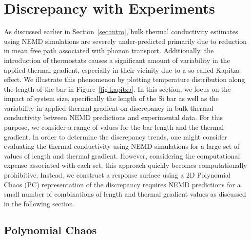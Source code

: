 \section{Discrepancy with Experiments}
\label{sec:response}

As discussed earlier in Section~\ref{sec:intro}, bulk thermal conductivity estimates using NEMD simulations
are severely under-predicted primarily due to reduction in mean free path associated with phonon transport. 
Additionally, the introduction of thermostats causes a significant amount of variability in the applied thermal gradient,
especially in their vicinity due to a so-called Kapitza effect. We illustrate this phenomenon by plotting temperature 
distribution along the length of the bar in Figure~\ref{fig:kapitza}. In this section, we focus on the impact of
system size, specifically the length of the Si bar as well as the variability in applied thermal gradient on discrepancy
in bulk thermal conductivity between NEMD predictions and experimental data. For this purpose, we consider
a range of values for the bar length and the thermal gradient. In order to determine the discrepancy trends, one
might consider evaluating the thermal conductivity using NEMD simulations for a large set of values of length and
thermal gradient. However, considering the computational expense associated with each set, this approach quickly
becomes computationally prohibitive. Instead, we construct a response surface using a 2D
Polynomial Chaos (PC) representation of the discrepancy requires NEMD predictions for a small number of
combinations of length and thermal gradient values as discussed in the following section. 

\subsection{Polynomial Chaos}